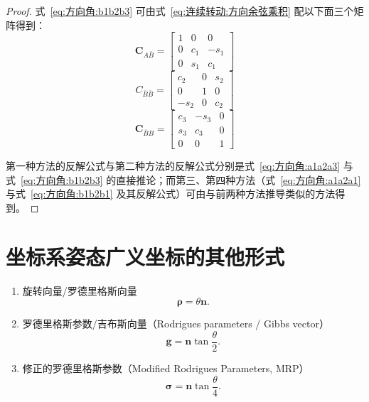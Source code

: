 \begin{proof}
式~\eqref{eq:方向角:b1b2b3} 可由式~\eqref{eq:连续转动:方向余弦乘积} 配以下面三个矩阵得到：
$$
\bm{C}_{A\bar B}=\begin{bmatrix}1&0&0\\0&c_1&-s_1\\0&s_1&c_1\end{bmatrix}
$$
$$
C_{\bar B\bar B}=\begin{bmatrix}c_2&0&s_2\\0&1&0\\-s_2&0&c_2\end{bmatrix}
$$
$$
\bm{C}_{\bar B B}=\begin{bmatrix}c_3&-s_3&0\\s_3&c_3&0\\0&0&1\end{bmatrix}
$$

第一种方法的反解公式与第二种方法的反解公式分别是式~\eqref{eq:方向角:a1a2a3} 与式~\eqref{eq:方向角:b1b2b3} 的直接推论；而第三、第四种方法（式~\eqref{eq:方向角:a1a2a1} 与式~\eqref{eq:方向角:b1b2b1} 及其反解公式）可由与前两种方法推导类似的方法得到。

\end{proof}

\section{坐标系姿态广义坐标的其他形式}

\begin{enumerate}
    \item 旋转向量/罗德里格斯向量
    \begin{equation}
        \bm{\rho} = \theta\bm{n}.
    \end{equation}

    \item 罗德里格斯参数/吉布斯向量（Rodrigues parameters / Gibbs vector）
    \begin{equation}
        \bm{g} = \bm{n}\tan\frac{\theta}{2}.
    \end{equation}

    \item 修正的罗德里格斯参数（Modified Rodrigues Parameters, MRP）
    \begin{equation}
        \bm{\sigma} = \bm{n}\tan\frac{\theta}{4}.
    \end{equation}
\end{enumerate}
%

